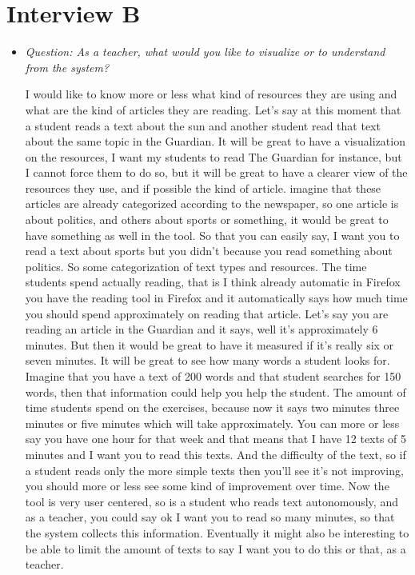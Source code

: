 \section*{Interview B}\label{interview02}
\begin{itemize}
	
		\item \textit{Question: As a teacher, what would you like to visualize or to understand from the system?}
		
I would like to know more or less what kind of resources they are using and what are the kind of articles they are reading. Let's say at this moment that a student reads a text about the sun and another student read that text about the same topic in the Guardian. It will be great to have a visualization on the resources, I want my students to read The Guardian for instance, but I cannot force them to do so, but it will be great to have a clearer view of the resources they use, and if possible the kind of article.
imagine that these articles are already categorized according to the newspaper, so one article is about politics, and others about sports or something, it would be great to have something as well in the tool. So that you can easily say, I want you to read a text about sports but you didn't because you read something about politics.
So some categorization of text types and resources. 
The time students spend actually reading, that is I think already automatic in Firefox you have the reading tool in Firefox and it automatically says how much time you should spend approximately on reading that article. Let's say you are reading an article in the Guardian and it says, well it's approximately 6 minutes. But then it would be great to have it measured if it's really six or seven minutes.
It will be great to see how many words a student looks for. Imagine that you have a text of 200 words and that student searches for 150 words, then that information could help you help the student.
The amount of time students spend on the exercises, because now it says two minutes three minutes or five minutes which will take approximately.
You can more or less say you have one hour for that week and that means that I have 12 texts of 5 minutes and I want you to read this texts.
And the difficulty of the text, so if a student reads only the more simple texts then you'll see it's not improving, you should more or less see some kind of improvement over time. 
Now the tool is very user centered, so is a student who reads text autonomously, and as a teacher, you could say ok I want you to read so many minutes, so that the system collects this information.
Eventually it might also be interesting to be able to limit the amount of texts to say I want you to do this or that, as a teacher. 


\end{itemize}
